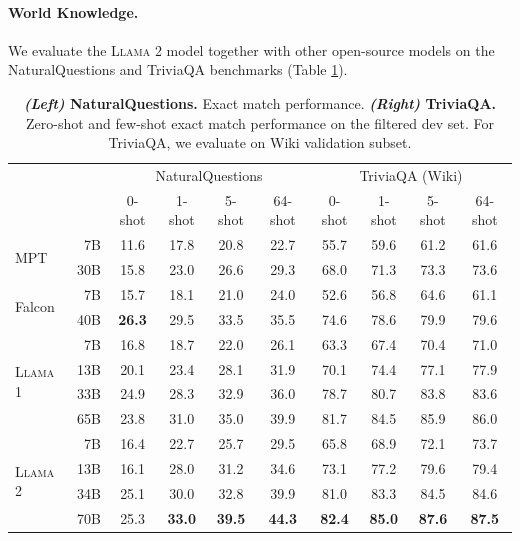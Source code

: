 \documentclass{article}
\newcommand{\anise}{\textsc{Llama 1}\xspace}
\newcommand{\cinnamon}{\textsc{Llama 2}\xspace}
\begin{document}
\paragraph{World Knowledge.} We evaluate the \cinnamon model together with other open-source models on the NaturalQuestions and TriviaQA benchmarks (Table \ref{tab:nq_tqa_table}). 
\begin{table}[htbp]
  \centering
  \begin{tabular}{@{}l@{} r cccc|cccc@{}}
    \toprule
           && \multicolumn{4}{c}{NaturalQuestions} & \multicolumn{4}{c}{TriviaQA (Wiki)} \\
           && 0-shot & 1-shot & 5-shot & 64-shot & 0-shot & 1-shot & 5-shot & 64-shot \\
    \midrule
    \multirow{2}{*}{MPT}     & 7B & 11.6 & 17.8 & 20.8 & 22.7 & 55.7 & 59.6 & 61.2 & 61.6 \\
         & 30B & 15.8 & 23.0 & 26.6 & 29.3 & 68.0 & 71.3 & 73.3 & 73.6 \\
    \midrule     
    \multirow{2}{*}{Falcon}  & 7B & 15.7 & 18.1 & 21.0 & 24.0 & 52.6 & 56.8 & 64.6 & 61.1 \\
      & 40B & \bf{26.3} & 29.5 & 33.5 & 35.5 & 74.6 & 78.6 & 79.9 & 79.6 \\    
    \midrule
    \multirow{4}{*}{\anise}  & 7B & 16.8 &	18.7 &	22.0 &	26.1 & 63.3 & 67.4 &	70.4 &	71.0 \\
            & 13B  & 20.1 &	23.4 &	28.1 &	31.9 & 70.1 & 74.4 &	77.1 &	77.9 \\
            & 33B  & 24.9 &	28.3 &	32.9 &	36.0 & 78.7 & 80.7 &	83.8 &	83.6 \\
            & 65B  & 23.8 &	31.0 & 35.0 & 39.9 & 81.7 & 84.5 & 85.9  & 86.0 \\
    \midrule
    \multirow{4}{*}{\cinnamon} & 7B  & 16.4 &  22.7 & 25.7 & 29.5 & 65.8 & 68.9 & 72.1 & 73.7 \\
            & 13B  & 16.1 & 28.0 & 31.2 & 34.6 & 73.1	& 77.2 & 79.6 & 79.4 \\
            & 34B  & 25.1 & 30.0 & 32.8 & 39.9  & 81.0 & 83.3 & 84.5 & 84.6 \\
            & 70B  & 25.3 & \bf{33.0} & \bf{39.5} & \bf{44.3} & \bf{82.4} & \bf{85.0} & \bf{87.6} &  \bf{87.5} \\
    \bottomrule
  \end{tabular}
  \caption{
    \textbf{\textit{(Left)} NaturalQuestions.} Exact match performance. \textbf{\textit{(Right)} TriviaQA.} Zero-shot and few-shot exact match performance on the filtered dev set. For TriviaQA, we evaluate on Wiki validation subset. 
  }
  \label{tab:nq_tqa_table}
\end{table}
\end{document}
